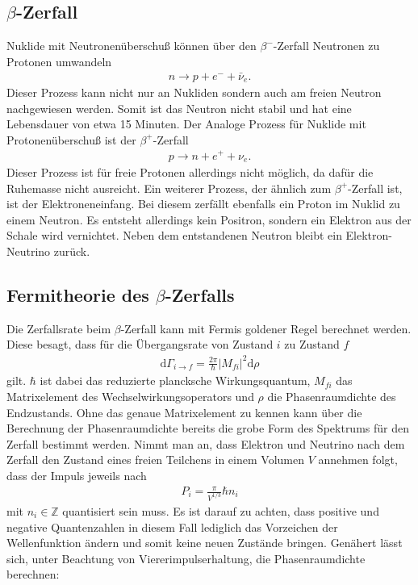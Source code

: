 \subsection{$\beta$-Zerfall}
Nuklide mit Neutronenüberschuß können über den $\beta^-$-Zerfall Neutronen zu Protonen umwandeln
\begin{align*}
  n \rightarrow p + e^- + \bar{\nu}_e.
\end{align*}
Dieser Prozess kann nicht nur an Nukliden sondern auch am freien Neutron nachgewiesen werden. Somit ist das Neutron nicht stabil und hat eine Lebensdauer von etwa 15 Minuten.
Der Analoge Prozess für Nuklide mit Protonenüberschuß ist der $\beta^+$-Zerfall
\begin{align*}
  p \rightarrow n + e^+ + \nu_e.
\end{align*}
Dieser Prozess ist für freie Protonen allerdings nicht möglich, da dafür die Ruhemasse nicht ausreicht. 
Ein weiterer Prozess, der ähnlich zum $\beta^+$-Zerfall ist, ist der Elektroneneinfang. Bei diesem zerfällt ebenfalls ein Proton im Nuklid zu einem Neutron. Es entsteht allerdings kein Positron, sondern ein Elektron aus der Schale wird vernichtet. Neben dem entstandenen Neutron bleibt ein Elektron-Neutrino zurück.

\subsection{Fermitheorie des $\beta$-Zerfalls}    
Die Zerfallsrate beim $\beta$-Zerfall kann mit Fermis goldener Regel berechnet werden. Diese besagt, dass für die Übergangsrate von Zustand $i$ zu Zustand $f$
\begin{align*}
  \mathrm{d}\Gamma_{i \rightarrow f}=\frac{2\pi}{\hbar}| M_{fi} |^2 \mathrm{d} \rho
\end{align*}
gilt. $\hbar$ ist dabei das reduzierte plancksche Wirkungsquantum, $M_{fi}$ das Matrixelement des Wechselwirkungsoperators und $\rho$ die Phasenraumdichte des Endzustands. Ohne das genaue Matrixelement zu kennen kann über die Berechnung der Phasenraumdichte bereits die grobe Form des Spektrums für den Zerfall bestimmt werden. Nimmt man an, dass Elektron und Neutrino nach dem Zerfall den Zustand eines freien Teilchens in einem Volumen $V$ annehmen folgt, dass der Impuls jeweils nach 
\begin{align*}
  P_i=\frac{\pi}{V^{1/3}}\hbar n_i
\end{align*}
mit $n_i \in \mathbb{Z}$ quantisiert sein muss. Es ist darauf zu achten, dass positive und negative Quantenzahlen in diesem Fall lediglich das Vorzeichen der Wellenfunktion ändern und somit keine neuen Zustände bringen. Genähert lässt sich, unter Beachtung von Viererimpulserhaltung, die Phasenraumdichte berechnen:

